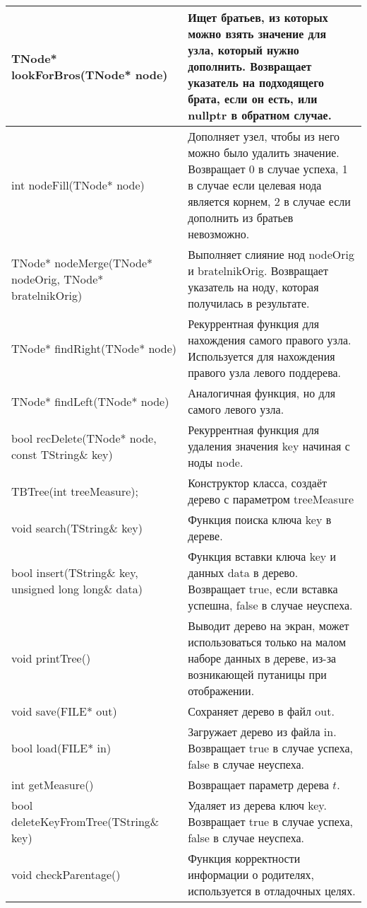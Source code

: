 \begin{longtable}{|p{7.5cm}|p{7.5cm}|}
\hline
{\ttfamily TNode* lookForBros(TNode* node)}&Ищет братьев, из которых можно взять значение для узла, который нужно дополнить. Возвращает указатель на подходящего брата, если он есть, или {\ttfamily nullptr} в обратном случае.\\
\hline
{\ttfamily int nodeFill(TNode* node)}&Дополняет узел, чтобы из него можно было удалить значение. Возвращает 0 в случае успеха, 1 в случае если целевая нода является корнем, 2 в случае если дополнить из братьев невозможно.\\
\hline
{\ttfamily TNode* nodeMerge(TNode* nodeOrig, TNode* bratelnikOrig)}&Выполняет слияние нод {\ttfamily nodeOrig} и {\ttfamily bratelnikOrig}. Возвращает указатель на ноду, которая получилась в результате.\\
\hline
{\ttfamily TNode* findRight(TNode* node)}&Рекуррентная функция для нахождения самого правого узла. Используется для нахождения правого узла левого поддерева.\\
\hline
{\ttfamily TNode* findLeft(TNode* node)}&Аналогичная функция, но для самого левого узла.\\
\hline
{\ttfamily bool recDelete(TNode* node, const TString\& key)}&Рекуррентная функция для удаления значения {\ttfamily key} начиная с ноды {\ttfamily node}.\\
\hline
{\ttfamily TBTree(int treeMeasure);}&Конструктор класса, создаёт дерево с параметром {\ttfamily treeMeasure}\\
\hline
{\ttfamily void search(TString\& key)}&Функция поиска ключа {\ttfamily key} в дереве.\\
\hline
{\ttfamily bool insert(TString\& key, unsigned long long\& data)}&Функция вставки ключа {\ttfamily key} и данных {\ttfamily data} в дерево. Возвращает {\ttfamily true}, если вставка успешна, {\ttfamily false} в случае неуспеха.\\
\hline
{\ttfamily void printTree()}&Выводит дерево на экран, может использоваться только на малом наборе данных в дереве, из-за возникающей путаницы при отображении.\\
\hline
{\ttfamily void save(FILE* out)}&Сохраняет дерево в файл {\ttfamily out}.\\
\hline
{\ttfamily bool load(FILE* in)}&Загружает дерево из файла {\ttfamily in}. Возвращает {\ttfamily true} в случае успеха, {\ttfamily false} в случае неуспеха.\\
\hline
{\ttfamily int getMeasure()}&Возвращает параметр дерева $t$.\\
\hline
{\ttfamily bool deleteKeyFromTree(TString\& key)}&Удаляет из дерева ключ {\ttfamily key}. Возвращает {\ttfamily true} в случае успеха, {\ttfamily false} в случае неуспеха.\\
\hline
{\ttfamily void checkParentage()}&Функция корректности информации о родителях, используется в отладочных целях.\\
\hline
\end{longtable}

